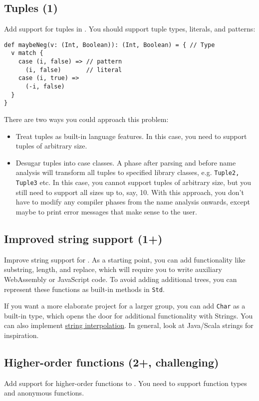 \subsection{Tuples (1)}
Add support for tuples in \langname. You should support
tuple types, literals, and patterns:

\begin{lstlisting}
def maybeNeg(v: (Int, Boolean)): (Int, Boolean) = { // Type
  v match {
    case (i, false) => // pattern
      (i, false)	   // literal
    case (i, true) =>
      (-i, false)
  }
}
\end{lstlisting}

There are two ways you could approach this problem:
\begin{itemize}
    \item Treat tuples as built-in language features. In this case,
        you need to support tuples of arbitrary size.
    \item Desugar tuples into case classes. A phase after
        parsing and before name analysis will transform all tuples
        to specified library classes, e.g. \lstinline{Tuple2, Tuple3} etc.
        In this case, you cannot support tuples of arbitrary size,
        but you still need to support all sizes up to, say, 10.
        With this approach, you don't have to modify any compiler phases
        from the name analysis onwards,
        except maybe to print error messages that make sense to the user.
\end{itemize}

\subsection{Improved string support (1+)}
Improve string support for \langname.
As a starting point, you can add functionality like substring, length, and replace,
which will require you to write auxiliary WebAssembly or JavaScript code.
To avoid adding additional trees,
you can represent these functions as built-in methods in \lstinline{Std}.

If you want a more elaborate project for a larger group,
you can add \lstinline{Char} as a built-in type,
which opens the door for additional functionality with Strings.
You can also implement
\href{https://docs.scala-lang.org/overviews/core/string-interpolation.html}{string interpolation}.
In general, look at Java/Scala strings for inspiration.

\subsection{Higher-order functions (2+, challenging)}
\label{closures}
Add support for higher-order functions to \langname.
You need to support function types and anonymous functions.

